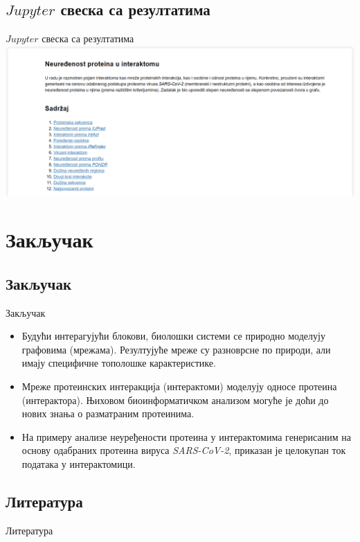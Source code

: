 \documentclass[hyperref={bookmarks=false}]{beamer}
\begin{document}
\subsection{$Jupyter$ свеска са резултатима}
\begin{frame}{$Jupyter$ свеска са резултатима}
\centering\includegraphics[width=\textwidth]{sveska.png}
\end{frame}


\section{Закључак}
\subsection{Закључак}
\begin{frame}{Закључак}
\begin{itemize}
	\item Будући интерагујући блокови, биолошки системи се природно моделују графовима (мрежама). Резултујуће мреже су разноврсне по природи, али имају специфичне тополошке карактеристике.

	\item Мреже протеинских интеракција (интерактоми) моделују односе протеина (интерактора). Њиховом биоинформатичком анализом могуће је доћи до нових знања о разматраним протеинима.

	\item На примеру анализе неуређености протеина у интерактомима генерисаним на основу одабраних протеина вируса \textit{SARS-CoV-2}, приказан је целокупан ток података у интерактомици.
\end{itemize}
\end{frame}

\subsection{Литература}
\begin{frame}{Литература}
\nocite{*}


\end{frame}
\end{document}
